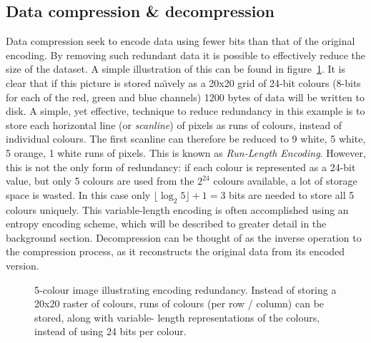 \subsection{Data compression \& decompression}
Data compression seek to encode data using fewer bits than that of the original encoding. By removing such redundant data it is possible to effectively 
reduce the size of the dataset. A simple illustration of this can be found in figure~\ref{COMP_ILLUS}. It is clear that if this picture is stored na\"{\i}vely as a 20x20
grid of 24-bit colours (8-bits for each of the red, green and blue channels) 1200 bytes of data will be written to disk. A simple, yet effective, technique to 
reduce redundancy in this example is to store each horizontal line (or \textit{scanline}) of pixels as runs of colours, instead of individual colours. The first 
scanline can therefore be reduced to 9 white, 5 white, 5 orange, 1 white runs of pixels. This is known as \textit{Run-Length Encoding}. However, this is not the only 
form of redundancy: if each colour is represented as a 24-bit value, but only 5 colours are used from the $2^{24}$ colours available, a lot of storage space is wasted. 
In this case only  $\lfloor\log_{2}{5}\rfloor+1 = 3$ bits are needed to store all 5 colours uniquely. This variable-length encoding is often accomplished using an 
entropy encoding scheme, which will be described to greater detail in the background section. Decompression can be thought of as the inverse operation to the compression 
process, as it reconstructs the original data from its encoded version.
\begin{figure}[ht!]
\begin{mdframed}
  \centering
 \caption{5-colour image illustrating encoding redundancy. Instead of storing a 20x20 raster of colours, runs of colours (per row / column) can be stored, along with variable-
 length representations of the colours, instead of using 24 bits per colour.}
 \label{COMP_ILLUS}
\end{mdframed}
\end{figure}
